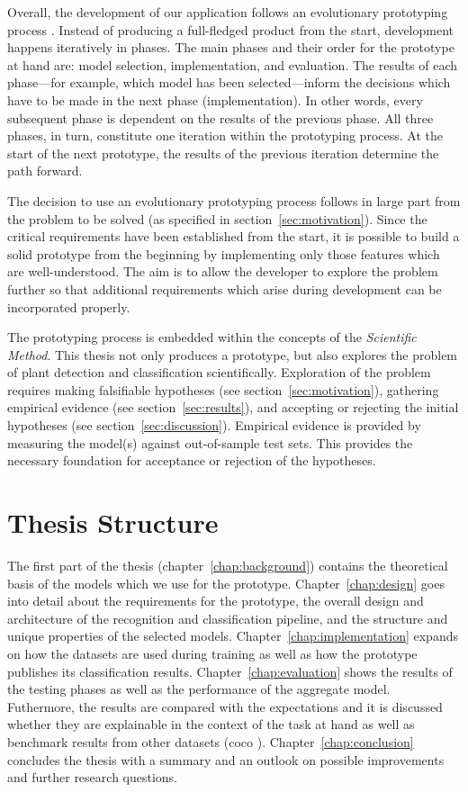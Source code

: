 \documentclass[draft,final]{vutinfth} %
\begin{document}
Overall, the development of our application follows an evolutionary
prototyping process \cite{davis1992,sears2007}. Instead of producing a
full-fledged product from the start, development happens iteratively
in phases. The main phases and their order for the prototype at hand
are: model selection, implementation, and evaluation. The results of
each phase—for example, which model has been selected—inform the
decisions which have to be made in the next phase (implementation). In
other words, every subsequent phase is dependent on the results of the
previous phase. All three phases, in turn, constitute one iteration
within the prototyping process. At the start of the next prototype,
the results of the previous iteration determine the path forward.

The decision to use an evolutionary prototyping process follows in
large part from the problem to be solved (as specified in
section~\ref{sec:motivation}). Since the critical requirements have
been established from the start, it is possible to build a solid
prototype from the beginning by implementing only those features which
are well-understood. The aim is to allow the developer to explore the
problem further so that additional requirements which arise during
development can be incorporated properly.

The prototyping process is embedded within the concepts of the
\emph{Scientific Method}. This thesis not only produces a prototype,
but also explores the problem of plant detection and classification
scientifically. Exploration of the problem requires making falsifiable
hypotheses (see section~\ref{sec:motivation}), gathering empirical
evidence (see section~\ref{sec:results}), and accepting or rejecting
the initial hypotheses (see section~\ref{sec:discussion}). Empirical
evidence is provided by measuring the model(s) against out-of-sample
test sets. This provides the necessary foundation for acceptance or
rejection of the hypotheses.

\section{Thesis Structure}
\label{sec:structure}

The first part of the thesis (chapter~\ref{chap:background}) contains
the theoretical basis of the models which we use for the
prototype. Chapter~\ref{chap:design} goes into detail about the
requirements for the prototype, the overall design and architecture of
the recognition and classification pipeline, and the structure and
unique properties of the selected
models. Chapter~\ref{chap:implementation} expands on how the datasets
are used during training as well as how the prototype publishes its
classification results. Chapter~\ref{chap:evaluation} shows the
results of the testing phases as well as the performance of the
aggregate model. Futhermore, the results are compared with the
expectations and it is discussed whether they are explainable in the
context of the task at hand as well as benchmark results from other
datasets (\gls{coco} \cite{lin2015}). Chapter~\ref{chap:conclusion}
concludes the thesis with a summary and an outlook on possible
improvements and further research questions.
\end{document}

